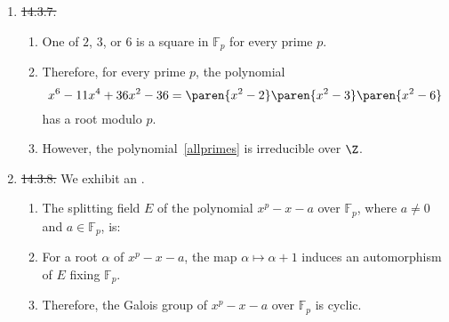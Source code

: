 \documentclass[onesided]{ccg-pset}
\newcommand{\Fp}{\mathbb{F}_p} %
\begin{document}
\begin{enumerate}
\begin{proof}
\begin{claim*}
    If $F$ is a finite field and $n \ge 1$ is an integer, there's a simple extension field $K = F(u)$ such that $[K:F]=n$. 
\end{claim*}

     Let $K$ be the splitting field of $x^{p^{n}} - x$ over $F$. We know that $F$ is also the splitting field of $x^{p^{n}} -x$ over $\Fp$. Thus each $u \in F$ satisfies $u^{p^n} - u = 0$, and so, by induction, also satisfies $u^{p^{rn}} = u$. 

    We assume: \textit{If $E$ is an intermediate field of the extension $K/F$ of the form $E = F(u_1, \ldots, u_k)$, where the $u_i$ are roots of some $f \in F[x]$, then $K$ is the splitting field of $f$ over $F$ if and only if $K$ is the splitting field of $f$ over $E$.} 

    Since $K$ is of the form $\Fp(u_1, \ldots, u_{p^n})$ with the $u_\ell$ all roots of $x^{p^{rn}}-x$, we conclude $K$ is also the splitting field of $x^{p^{rn}} -x$ over $\Fp$. Therefore $K$ contains the $p^{rn}$ roots of $x^{p^{rn}}-x$. Then
    \begin{equation*}
        p^{rn} = \abs{K} = \abs{F}^{[K:F]} = p^{r[K:F]} \qq{and so} [K:F] = n.
    \end{equation*}
\end{proof}

    \item \label{14.3.7} \sout{ 14.3.7. }
        \begin{enumerate}
    \item One of $2$, $3$, or $6$ is a square in $\Fp$ for every prime $p$.
        \item Therefore, for every prime $p$, the polynomial 
        \begin{equation}
    \label{allprimes}
    x^6 - 11x^{4} + 36x^{2} - 36 = \paren{x^{2} -2} \paren{x^{2} -3} \paren{x^{2} -6} 
    \end{equation}
    has a root modulo $p$.
        \item However, the polynomial~\eqref{allprimes} is irreducible over $\Z$.
        \end{enumerate}


    \item \label{14.3.8} \sout{ 14.3.8. } We exhibit an .
        \begin{enumerate}
    \item The splitting field $E$ of the polynomial $x^p - x -a$ over $\Fp$, where $a \neq 0$ and $a \in \Fp$, is:
        \item For a root $\alpha$ of $x^p - x -a$, the map $\alpha \mapsto \alpha + 1$ induces an automorphism of $E$ fixing $\Fp$.
        \item Therefore, the Galois group of $x^p - x -a$ over $\Fp$ is cyclic.
        \end{enumerate}


\end{enumerate}
\end{document}
